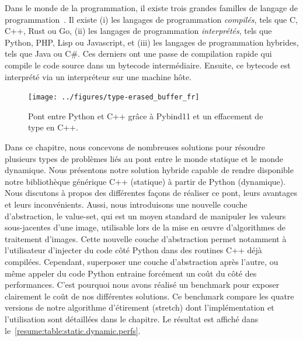 Dans le monde de la programmation, il existe trois grandes familles de langage de
programmation~\parencite{prechelt.2000.comparison}. Il existe (i) les langages de programmation \emph{compilés}, tels
que C, C++, Rust ou Go, (ii) les langages de programmation \emph{interprétés}, tels que Python, PHP, Lisp ou Javascript,
et (iii) les langages de programmation hybrides, tels que Java ou C\#. Ces derniers ont une passe de compilation rapide
qui compile le code source dans un bytecode intermédiaire. Ensuite, ce bytecode est interprété via un interpréteur sur
une machine hôte.

\begin{figure}[htbp]
  \centering
  \texttt{[image: ../figures/type-erased\_buffer\_fr]}
  \caption[]{Pont entre Python et C++ grâce à Pybind11 et un effacement de type en C++.}
  \label{resume:fig:type-erased.buffer}
\end{figure}

Dans ce chapitre, nous concevons de nombreuses solutions pour résoudre plusieurs types de problèmes liés au pont entre
le monde statique et le monde dynamique. Nous présentons notre solution hybride capable de rendre disponible notre
bibliothèque générique C++ (statique) à partir de Python (dynamique). Nous discutons à propos des différentes façons de
réaliser ce pont, leurs avantages et leurs inconvénients. Aussi, nous introduisons une nouvelle couche d'abstraction, le
value-set, qui est un moyen standard de manipuler les valeurs sous-jacentes d'une image, utilisable lors de la mise en
\oe{}uvre d'algorithmes de traitement d'images. Cette nouvelle couche d'abstraction permet notamment à l'utilisateur
d'injecter du code côté Python dans des routines C++ déjà compilées. Cependant, superposer une couche d'abstraction
après l'autre, ou même appeler du code Python entraine forcément un coût du côté des performances. C'est pourquoi nous
avons réalisé un benchmark pour exposer clairement le coût de nos différentes solutions. Ce benchmark compare les quatre
versions de notre algorithme d'étirement (stretch) dont l'implémentation et l'utilisation sont détaillées dans le
chapitre. Le résultat est affiché dans le~\cref{resume:table:static.dynamic.perfs}.

